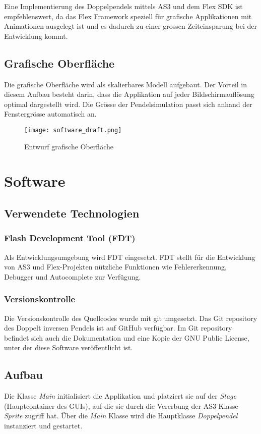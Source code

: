 \documentclass[12pt]{article}
\numberwithin{equation}{subsection}
\begin{document}
Eine Implementierung des Doppelpendels mittels AS3 und dem Flex SDK ist empfehlenswert, da das Flex Framework speziell für grafische Applikationen mit Animationen ausgelegt ist und es dadurch zu einer grossen Zeiteinsparung bei der Entwicklung kommt.

\subsection{Grafische Oberfläche}
Die grafische Oberfläche wird als skalierbares Modell aufgebaut. Der Vorteil in diesem Aufbau besteht darin, dass die Applikation auf jeder Bildschirmauflösung optimal dargestellt wird. Die Grösse der Pendelsimulation passt sich anhand der Fenstergrösse automatisch an.

\begin{figure}[H]
	\centering
	\texttt{[image: software\_draft.png]}
	\caption{Entwurf grafische Oberfläche}
	\label{fig:gui:draft}
\end{figure}


\newpage
\section{Software}
\subsection{Verwendete Technologien}
\subsubsection{Flash Development Tool (FDT)}
Als Entwicklungsumgebung wird FDT \citep{fdt} eingesetzt. FDT stellt für die Entwicklung von AS3 und Flex-Projekten nützliche Funktionen wie Fehlererkennung, Debugger und Autocomplete zur Verfügung.

\subsubsection{Versionskontrolle}
Die Versionskontrolle des Quellcodes wurde mit git \citep{git} umgesetzt. Das Git repository des Doppelt inversen Pendels ist auf GitHub \citep{github} verfügbar. Im Git repository befindet sich auch die Dokumentation und eine Kopie der GNU Public License, unter der diese Software veröffentlicht ist.


\subsection{Aufbau}
Die Klasse \textit{Main} initialisiert die Applikation und platziert sie auf der \textit{Stage} (Hauptcontainer des GUIs), auf die sie durch die Vererbung der AS3 Klasse \textit{Sprite} zugriff hat. Über die \textit{Main} Klasse wird die Hauptklasse \textit{Doppelpendel} instanziert und gestartet. 
\end{document}
